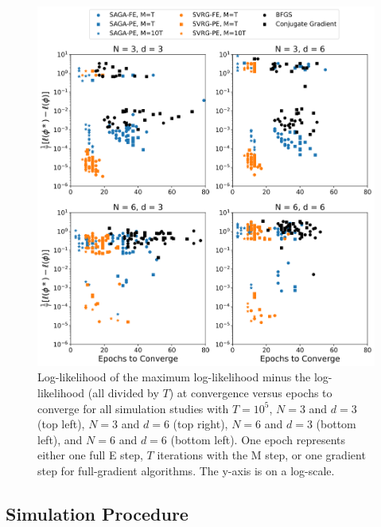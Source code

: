 \begin{figure}[h]
    \centering
    \includegraphics[width=5in]{../plt/scatter_sim_T_100000.png}
    \caption{Log-likelihood of the maximum log-likelihood minus the log-likelihood (all divided by $T$) at convergence versus epochs to converge for all simulation studies with $T=10^{5}$, $N=3$ and $d=3$ (top left), $N=3$ and $d=6$ (top right), $N=6$ and $d=3$ (bottom left), and $N=6$ and $d=6$ (bottom left). One epoch represents either one full E step, $T$ iterations with the M step, or one gradient step for full-gradient algorithms. The y-axis is on a log-scale.}
    \label{fig:scatter_sim}
\end{figure}

\subsection{Simulation Procedure}

